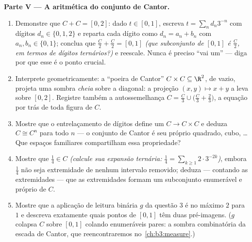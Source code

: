 \begin{problem}
\medskip
\noindent\textbf{Parte V --- A aritmética do conjunto de Cantor.}
\begin{enumerate}[resume]
  \item Demonstre que $C + C = [0, 2]$: dado $t \in [0, 1]$, escreva $t = \sum_n d_n3^{-n}$ com dígitos $d_n \in \{0,
        1, 2\}$
        e reparta cada dígito como $d_n = a_n + b_n$ com $a_n, b_n \in \{0, 1\}$; conclua que $\frac C2 +
        \frac C2 = [0, 1]$
        \emph{(que subconjunto de $[0,1]$ é $\frac C2$, em termos de
        dígitos ternários?)} e reescale. Nunca é preciso ``vai um'' ---
        diga por que esse é o ponto crucial.
  \item Interprete geometricamente: a ``poeira de Cantor'' $C \times
        C \subseteq \R^2$, de
         vazio, projeta uma sombra \emph{cheia} sobre a
        diagonal: a projeção $(x,
        y) \mapsto x + y$ a leva sobre $[0, 2]$. Registre
        também a autossemelhança $C = \frac C3 \cup \bigl(\frac C3 +
        \frac23\bigr)$, a equação por trás de toda
        figura de $C$.
  \item Mostre que o entrelaçamento de dígitos define um 
        $C
        \to C \times C$ e deduza $C \cong C^n$ para todo $n$ --- o conjunto de Cantor
        é seu próprio quadrado, cubo, \dots{} Que espaços familiares
        compartilham essa propriedade?
  \item Mostre que $\frac14 \in C$ \emph{(calcule sua expansão ternária:
        $\frac14 = \sum_{k\geq1} 2\cdot3^{-2k}$)}, embora $\frac14$ não seja extremidade de nenhum intervalo
        removido; deduza --- contando as extremidades --- que as
        extremidades formam um subconjunto enumerável e próprio de
        $C$.
  \item Mostre que a aplicação de leitura binária $g$ da questão 3
        é no máximo $2$ para $1$ e descreva exatamente quais
        pontos de $[0,1]$ têm duas pré-imagens. ($g$ colapsa
        $C$ sobre $[0,1]$ colando enumeráveis pares: a sombra
        combinatória da escada de Cantor, que reencontraremos no~\cref{ch:b3:measure}.)
\end{enumerate}


\end{problem}
